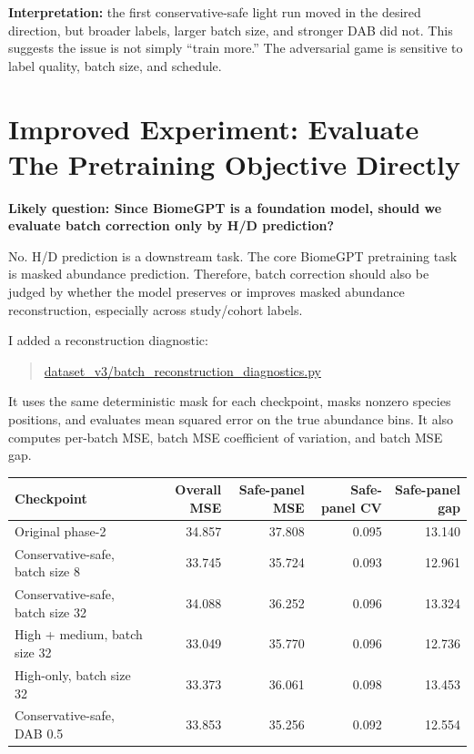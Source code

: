 \documentclass[11pt]{article}
\newcommand{\filepath}[1]{\begingroup\urlstyle{tt}\small\url{#1}\endgroup}
\begin{document}
\textbf{Interpretation:} the first conservative-safe light run moved in the desired
direction, but broader labels, larger batch size, and stronger DAB did not. This suggests
the issue is not simply ``train more.'' The adversarial game is sensitive to label quality,
batch size, and schedule.

\section{Improved Experiment: Evaluate The Pretraining Objective Directly}

\textbf{Likely question: Since BiomeGPT is a foundation model, should we evaluate batch
correction only by H/D prediction?}

No. H/D prediction is a downstream task. The core BiomeGPT pretraining task is masked
abundance prediction. Therefore, batch correction should also be judged by whether the
model preserves or improves masked abundance reconstruction, especially across
study/cohort labels.

I added a reconstruction diagnostic:

\begin{quote}
\filepath{dataset_v3/batch_reconstruction_diagnostics.py}
\end{quote}

It uses the same deterministic mask for each checkpoint, masks nonzero species positions,
and evaluates mean squared error on the true abundance bins. It also computes per-batch
MSE, batch MSE coefficient of variation, and batch MSE gap.

\begin{center}
\small
\begin{tabular}{p{}rrrr}
\toprule
Checkpoint & Overall MSE & Safe-panel MSE & Safe-panel CV & Safe-panel gap \\
\midrule
Original phase-2 & 34.857 & 37.808 & 0.095 & 13.140 \\
Conservative-safe, batch size 8 & 33.745 & 35.724 & 0.093 & 12.961 \\
Conservative-safe, batch size 32 & 34.088 & 36.252 & 0.096 & 13.324 \\
High + medium, batch size 32 & 33.049 & 35.770 & 0.096 & 12.736 \\
High-only, batch size 32 & 33.373 & 36.061 & 0.098 & 13.453 \\
Conservative-safe, DAB 0.5 & 33.853 & 35.256 & 0.092 & 12.554 \\
\bottomrule
\end{tabular}
\end{center}
\end{document}
